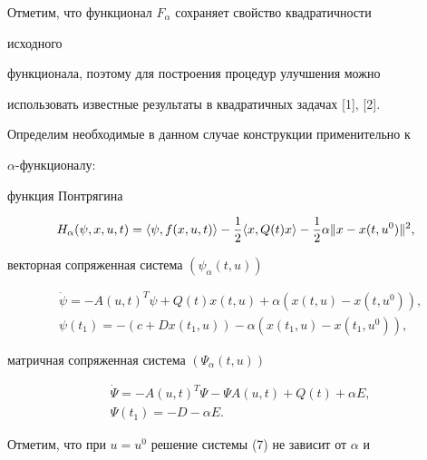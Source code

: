 Отметим, что функционал $F_\alpha$ сохраняет свойство квадратичности 


исходного 


функционала, поэтому для построения процедур улучшения можно 


использовать известные результаты в квадратичных задачах [1], [2]. 


Определим необходимые в данном случае конструкции применительно к 


$\alpha$-функционалу: 


 


функция Понтрягина 


$$ 


H_\alpha(\psi,x,u,t)=\la\psi,f(x,u,t)\ra-\frac{1}{2} 


\la x,Q(t)x\ra-\frac{1}{2}\alpha\|x-x(t,u^0)\|^2, 


$$ 


 


векторная сопряженная система $(\psi_\alpha(t,u))$ 


\begin{equation} 


\begin{split} 


&\Dot\psi=-A(u,t)^T\psi+Q(t)x(t,u)+\alpha(x(t,u)-x(t,u^0)),\\ 


&\psi(t_1)=-(c+Dx(t_1,u))-\alpha(x(t_1,u)-x(t_1,u^0)), 


\end{split} 


\end{equation} 


 


матричная сопряженная система $(\Psi_\alpha(t,u))$ 


\begin{equation} 


\begin{split} 


&\Dot\Psi=-A(u,t)^T\Psi-\Psi A(u,t)+Q(t)+\alpha E,\\ 


&\Psi(t_1)=-D-\alpha E. 


\end{split} 


\end{equation} 


Отметим, что при $u=u^0$ решение системы (7) не зависит от $\alpha$ и 


